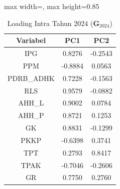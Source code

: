 \begin{table}[H]
\centering
\caption{Loading Intra Tahun 2024 ($\mathbf{G}_{2024}$)} \label{tab:loading_intra_2024}
\begin{adjustbox}{max width=\textwidth, max height=0.85\textheight}
\begin{tabular}{|c|c|c|}
\hline
\textbf{Variabel} & \textbf{PC1} & \textbf{PC2} \\
\hline
IPG & 0.8276 & -0.2543 \\
PPM & -0.8884 & 0.0563 \\
PDRB\_ADHK & 0.7228 & -0.1563 \\
RLS & 0.9579 & -0.0882 \\
AHH\_L & 0.9002 & 0.0784 \\
AHH\_P & 0.8721 & 0.1253 \\
GK & 0.8831 & -0.1299 \\
PKKP & -0.6398 & 0.3741 \\
TPT & 0.2793 & 0.8417 \\
TPAK & -0.7046 & -0.2606 \\
GR & 0.7750 & 0.2760 \\
\hline
\end{tabular}
\end{adjustbox}
\end{table}